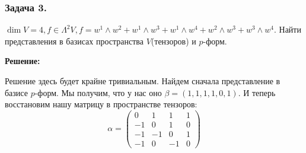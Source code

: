 \subsubsection{Задача 3.}

$\dim V = 4, f \in \Lambda^2V, f = w^1\wedge w^2 + w^1 \wedge w^3 + w^1\wedge w^4 + w^2\wedge w^3 + w^3 \wedge w^4$. Найти представления в базисах пространства $V$(тензоров) и $p$-форм.

\textbf{Решение:}

Решение здесь будет крайне тривиальным. Найдем сначала представление в базисе $p$-форм. Мы получим, что у нас оно $\beta= (1,1,1,1,0,1)$. И теперь восстановим нашу матрицу в пространстве тензоров:
$$\alpha =\begin{pmatrix}
    0 & 1 & 1 & 1\\
    -1 & 0 & 1 & 0 \\
    -1 & -1 & 0 & 1 \\
    -1 & 0 & -1 & 0
\end{pmatrix}$$

